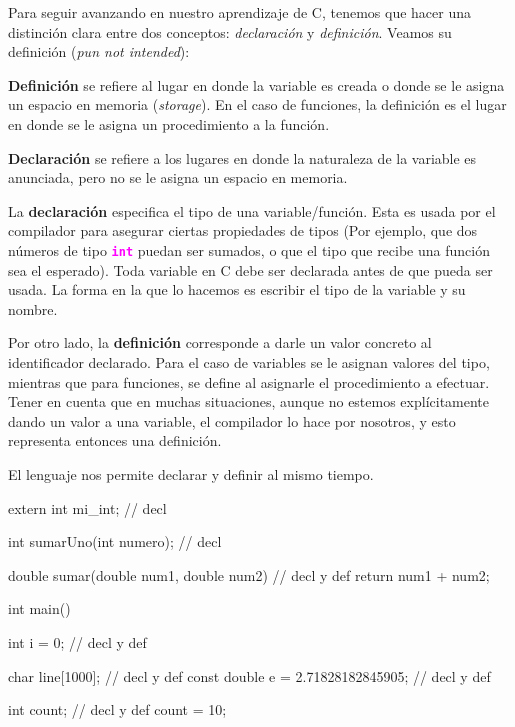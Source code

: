 \documentclass[]{scrartcl}
\newcommand{\hl}[1]{\textcolor{magenta}{\textbf{\texttt{#1}}}}
\begin{document}
Para seguir avanzando en nuestro aprendizaje de C, tenemos que hacer una distinción clara entre dos conceptos: \textit{declaración} y \textit{definición}. Veamos su definición (\textit{pun not intended}):

\textbf{Definición} se refiere al lugar en donde la variable es creada o donde se le asigna un espacio en memoria (\textit{storage}). En el caso de funciones, la definición es el lugar en donde se le asigna un procedimiento a la función.

\textbf{Declaración} se refiere a los lugares en donde la naturaleza de la variable es anunciada, pero no se le asigna un espacio en memoria.

La \textbf{declaración} especifica el tipo de una variable/función. Esta es usada por el compilador para asegurar ciertas propiedades de tipos (Por ejemplo, que dos números de tipo \hl{int} puedan ser sumados, o que el tipo que recibe una función sea el esperado). Toda variable en C debe ser declarada antes de que pueda ser usada. La forma en la que lo hacemos es escribir el tipo de la variable y su nombre.

Por otro lado, la \textbf{definición} corresponde a darle un valor concreto al identificador declarado. Para el caso de variables se le asignan valores del tipo, mientras que para funciones, se define al asignarle el procedimiento a efectuar. Tener en cuenta que en muchas situaciones, aunque no estemos explícitamente dando un valor a una variable, el compilador lo hace por nosotros, y esto representa entonces una definición. 

El lenguaje nos permite declarar y definir al mismo tiempo.

\begin{cbox}[]{}

  extern int mi_int;                   // decl

  int sumarUno(int numero);            // decl

  double sumar(double num1, double num2){ // decl y def
    return num1 + num2;
  }

  int main(){
    int i = 0;                         // decl y def
    
    char line[1000];                   // decl y def
    const double e = 2.71828182845905; // decl y def

    int count;                         // decl y def
    count = 10;                        
  }
\end{cbox}
\end{document}
